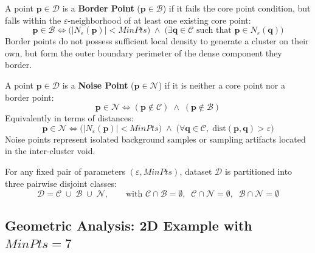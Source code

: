 \begin{definition}
A point $\mathbf{p} \in \mathcal{D}$ is a \textbf{Border Point} ($\mathbf{p} \in \mathcal{B}$) if it fails the core point condition, but falls within the $\varepsilon$-neighborhood of at least one existing core point:
\begin{equation}
    \mathbf{p} \in \mathcal{B} \iff \Big(|N_\varepsilon(\mathbf{p})| < MinPts\Big) \;\land\; \Big(\exists \mathbf{q} \in \mathcal{C} \text{ such that } \mathbf{p} \in N_\varepsilon(\mathbf{q})\Big)
    \label{eq:dm-border-point-condition}
\end{equation}
Border points do not possess sufficient local density to generate a cluster on their own, but form the outer boundary perimeter of the dense component they border.
\end{definition}

\begin{definition}
A point $\mathbf{p} \in \mathcal{D}$ is a \textbf{Noise Point} ($\mathbf{p} \in \mathcal{N}$) if it is neither a core point nor a border point:
\begin{equation}
    \mathbf{p} \in \mathcal{N} \iff (\mathbf{p} \notin \mathcal{C}) \;\land\; (\mathbf{p} \notin \mathcal{B})
    \label{eq:dm-noise-point-condition}
\end{equation}
Equivalently in terms of distances:
\begin{equation}
    \mathbf{p} \in \mathcal{N} \iff \Big(|N_\varepsilon(\mathbf{p})| < MinPts\Big) \;\land\; \Big(\forall \mathbf{q} \in \mathcal{C}, \; \mathrm{dist}(\mathbf{p}, \mathbf{q}) > \varepsilon\Big)
\end{equation}
Noise points represent isolated background samples or sampling artifacts located in the inter-cluster void.
\end{definition}

\begin{property}
For any fixed pair of parameters $(\varepsilon, MinPts)$, dataset $\mathcal{D}$ is partitioned into three pairwise disjoint classes:
\begin{equation}
    \mathcal{D} = \mathcal{C} \;\cup\; \mathcal{B} \;\cup\; \mathcal{N}, \qquad \text{with } \mathcal{C} \cap \mathcal{B} = \emptyset, \;\; \mathcal{C} \cap \mathcal{N} = \emptyset, \;\; \mathcal{B} \cap \mathcal{N} = \emptyset
\end{equation}
\end{property}

\subsection{Geometric Analysis: 2D Example with \texorpdfstring{$MinPts = 7$}{MinPts = 7}}

